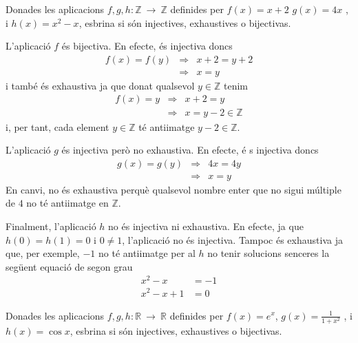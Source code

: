 \begin{exer}
Donades les aplicacions $f,g,h:\mathbb{Z}~\longrightarrow ~\mathbb{Z}$
definides per $f(x)=x+2$ $g(x)=4x$ , i $h(x)=x^{2}-x$, esbrina si s\'{o}n
injectives, exhaustives o bijectivas.
\end{exer}

\begin{solucio}
L'aplicaci\'{o} $f$ \'{e}s bijectiva. En efecte, \'{e}s injectiva doncs%
\begin{equation*}
\begin{array}{lll}
f(x)=f(y) & \Longrightarrow & x+2=y+2 \\
& \Longrightarrow & x=y%
\end{array}%
\end{equation*}%
i tamb\'{e} \'{e}s exhaustiva ja que donat qualsevol $y\in \mathbb{Z}$ tenim%
\begin{equation*}
\begin{array}{lll}
f(x)=y & \Longrightarrow & x+2=y \\
& \Longrightarrow & x=y-2\in \mathbb{Z}%
\end{array}%
\end{equation*}%
i, per tant, cada element $y\in \mathbb{Z}$ t\'{e} antiimatge $y-2\in
\mathbb{Z}$.

L'aplicaci\'{o} $g$ \'{e}s injectiva per\`{o} no exhaustiva. En efecte, \'{e}%
s injectiva doncs%
\begin{equation*}
\begin{array}{lll}
g(x)=g(y) & \Longrightarrow & 4x=4y \\
& \Longrightarrow & x=y%
\end{array}%
\end{equation*}%
En canvi, no \'{e}s exhaustiva perqu\`{e} qualsevol nombre enter que no
sigui m\'{u}ltiple de $4$ no t\'{e} antiimatge en $\mathbb{Z}$.

Finalment, l'aplicaci\'{o} $h$ no \'{e}s injectiva ni exhaustiva. En efecte,
ja que $h(0)=h(1)=0$ i $0\neq 1$, l'aplicaci\'{o} no \'{e}s injectiva.
Tampoc \'{e}s exhaustiva ja que, per exemple, $-1$ no t\'{e} antiimatge per
al $h$ no tenir solucions senceres la seg\"{u}ent equaci\'{o} de segon grau%
\begin{align*}
x^{2}-x& =-1 \\
x^{2}-x+1& =0
\end{align*}
\end{solucio}

\begin{exer}
Donades les aplicacions $f,g,h:\mathbb{R}~\longrightarrow ~\mathbb{R}$
definides per $f(x)=e^{x}$, $g(x)=\frac{1}{1+x^{2}}$ , i $h(x)=\cos x$,
esbrina si s\'{o}n injectives, exhaustives o bijectivas.
\end{exer}

